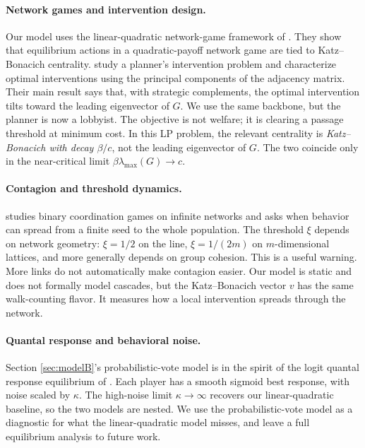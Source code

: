 \documentclass[11pt,letterpaper]{article}
\theoremstyle{plain}
\theoremstyle{definition}
\theoremstyle{remark}
\begin{document}
\paragraph{Network games and intervention design.} Our model uses the linear-quadratic network-game framework of \citet{bcz2006}. They show that equilibrium actions in a quadratic-payoff network game are tied to Katz--Bonacich centrality. \citet{ggg2020} study a planner's intervention problem and characterize optimal interventions using the principal components of the adjacency matrix. Their main result says that, with strategic complements, the optimal intervention tilts toward the leading eigenvector of $G$. We use the same backbone, but the planner is now a lobbyist. The objective is not welfare; it is clearing a passage threshold at minimum cost. In this LP problem, the relevant centrality is \emph{Katz--Bonacich with decay $\beta/c$}, not the leading eigenvector of $G$. The two coincide only in the near-critical limit $\beta \lambda_{\max}(G) \to c$.

\paragraph{Contagion and threshold dynamics.} \citet{morris2000} studies binary coordination games on infinite networks and asks when behavior can spread from a finite seed to the whole population. The threshold $\xi$ depends on network geometry: $\xi = 1/2$ on the line, $\xi = 1/(2m)$ on $m$-dimensional lattices, and more generally depends on group cohesion. This is a useful warning. More links do not automatically make contagion easier. Our model is static and does not formally model cascades, but the Katz--Bonacich vector $v$ has the same walk-counting flavor. It measures how a local intervention spreads through the network.

\paragraph{Quantal response and behavioral noise.} Section \ref{sec:modelB}'s probabilistic-vote model is in the spirit of the logit quantal response equilibrium of \citet{mckelvey1995}. Each player has a smooth sigmoid best response, with noise scaled by $\kappa$. The high-noise limit $\kappa \to \infty$ recovers our linear-quadratic baseline, so the two models are nested. We use the probabilistic-vote model as a diagnostic for what the linear-quadratic model misses, and leave a full equilibrium analysis to future work.
\end{document}

